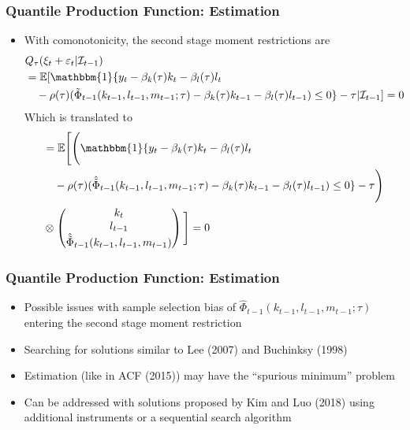 \documentclass{beamer}
\begin{document}

\begin{frame}
\frametitle{Quantile Production Function: Estimation}
\begin{itemize}
	\item With comonotonicity, the second stage moment restrictions are
	\scriptsize
	\begin{equation}
		\begin{split}
			&Q_{\tau}(\xi_{t}+\varepsilon_{t}|\mathcal{I}_{t-1})\\
			&=\mathbb{E}[\mathbbm{1}\{y_{t}-\beta_{k}(\tau)k_{t}-\beta_{l}(\tau)l_{t}\\
			& \quad -\rho(\tau)(\tilde{\Phi}_{t-1}(k_{t-1}, l_{t-1}, m_{t-1};\tau)-\beta_{k}(\tau)k_{t-1}-\beta_{l}(\tau)l_{t-1})\leq 0\}-\tau|\mathcal{I}_{t-1}]=0
		\end{split}
	\end{equation}
	\normalsize
	Which is translated to
	\scriptsize
	\begin{equation}
		\begin{split}
			&=\mathbb{E}\Bigg[\Bigg(\mathbbm{1}\{y_{t}-\beta_{k}(\tau)k_{t}-\beta_{l}(\tau)l_{t}\\
						& \quad -\rho(\tau)(\hat{\tilde{\Phi}}_{t-1}(k_{t-1}, l_{t-1}, m_{t-1};\tau)-\beta_{k}(\tau)k_{t-1}-\beta_{l}(\tau)l_{t-1})\leq 0\}-\tau\Bigg) \\
						&\otimes
			\begin{pmatrix}
			k_{t}\\
			l_{t-1}\\
			\hat{\tilde{\Phi}}_{t-1}(k_{t-1}, l_{t-1}, m_{t-1})
			\end{pmatrix}\Bigg]=0
			\normalsize
		\end{split}
	\end{equation}
\end{itemize}
\end{frame}


\begin{frame}
\frametitle{Quantile Production Function: Estimation}
\begin{itemize}
	\item Possible issues with sample selection bias of $\hat{\Phi}_{t-1}(k_{t-1}, l_{t-1}, m_{t-1}; \tau)$ entering the second stage moment restriction
	\item Searching for solutions similar to Lee (2007) and Buchinksy (1998)
	\item Estimation (like in ACF (2015)) may have the ``spurious minimum'' problem
	\item Can be addressed with solutions proposed by Kim and Luo (2018) using additional instruments or a sequential search algorithm
\end{itemize}
\end{frame}
\end{document}
